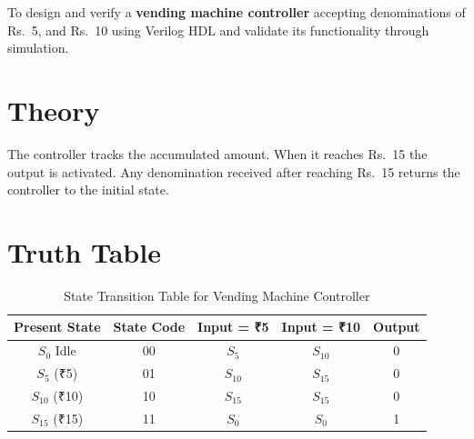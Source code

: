 \documentclass[12pt,a4paper]{report}
\begin{document}
To design and verify a \textbf{vending machine controller} accepting denominations of Rs.\ 5, and  Rs.\ 10 using Verilog HDL and validate its functionality through simulation.



\section{Theory}

The controller tracks the accumulated amount. When it reaches Rs.\ 15 the output is activated. Any denomination received after reaching Rs.\ 15 returns the controller to the initial state.

\section{Truth Table}

\begin{table}[H]
\centering
\caption{State Transition Table for Vending Machine Controller}
\label{tab:vending_fsm}
\begin{tabular}{|c|c|c|c|c|}
\hline
\textbf{Present State} & \textbf{State Code} & 
\textbf{Input = ₹5} & \textbf{Input = ₹10} & \textbf{Output} \\ 
\hline

$S_0$ Idle  & 00 & $S_5$  & $S_{10}$ & 0 \\ 
\hline

$S_5$ (₹5)  & 01 & $S_{10}$ & $S_{15}$ & 0 \\ 
\hline

$S_{10}$ (₹10) & 10 & $S_{15}$ & $S_{15}$ & 0 \\ 
\hline

$S_{15}$ (₹15) & 11 & $S_0$ & $S_0$ & 1 \\ 
\hline

\end{tabular}
\end{table}
\vspace{3cm}
\end{document}
